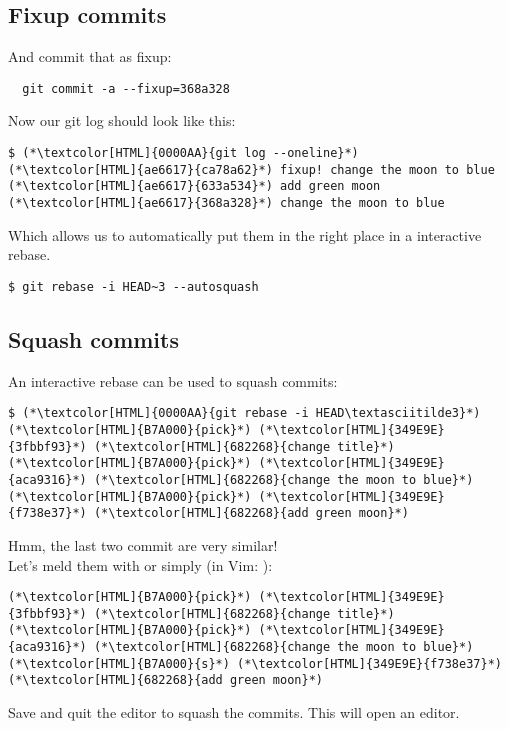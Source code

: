 \subsection{Fixup commits}
\begin{frame}[fragile]
  \subslidetitle

  And commit that as fixup:
  \begin{lstlisting}
  git commit -a --fixup=368a328
\end{lstlisting}

  Now our git log should look like this:
    \begin{lstlisting}
$ (*\textcolor[HTML]{0000AA}{git log --oneline}*)
(*\textcolor[HTML]{ae6617}{ca78a62}*) fixup! change the moon to blue
(*\textcolor[HTML]{ae6617}{633a534}*) add green moon
(*\textcolor[HTML]{ae6617}{368a328}*) change the moon to blue
\end{lstlisting}

  Which allows us to automatically put them in the right place in a interactive rebase.
  \begin{lstlisting}
$ git rebase -i HEAD~3 --autosquash
\end{lstlisting}

\end{frame}


\subsection{Squash commits}
\begin{frame}[fragile]
  \subslidetitle
  An interactive rebase can be used to squash commits:
  \begin{lstlisting}
$ (*\textcolor[HTML]{0000AA}{git rebase -i HEAD\textasciitilde3}*)
(*\textcolor[HTML]{B7A000}{pick}*) (*\textcolor[HTML]{349E9E}{3fbbf93}*) (*\textcolor[HTML]{682268}{change title}*)
(*\textcolor[HTML]{B7A000}{pick}*) (*\textcolor[HTML]{349E9E}{aca9316}*) (*\textcolor[HTML]{682268}{change the moon to blue}*)
(*\textcolor[HTML]{B7A000}{pick}*) (*\textcolor[HTML]{349E9E}{f738e37}*) (*\textcolor[HTML]{682268}{add green moon}*)
\end{lstlisting}
  Hmm, the last two commit are very similar!\\

  \vspace{1em}
  Let's meld them with  or simply  (in Vim: ):
  \begin{lstlisting}
(*\textcolor[HTML]{B7A000}{pick}*) (*\textcolor[HTML]{349E9E}{3fbbf93}*) (*\textcolor[HTML]{682268}{change title}*)
(*\textcolor[HTML]{B7A000}{pick}*) (*\textcolor[HTML]{349E9E}{aca9316}*) (*\textcolor[HTML]{682268}{change the moon to blue}*)
(*\textcolor[HTML]{B7A000}{s}*) (*\textcolor[HTML]{349E9E}{f738e37}*) (*\textcolor[HTML]{682268}{add green moon}*)
\end{lstlisting}
  Save and quit the editor to squash the commits. This will open an editor.
\end{frame}


